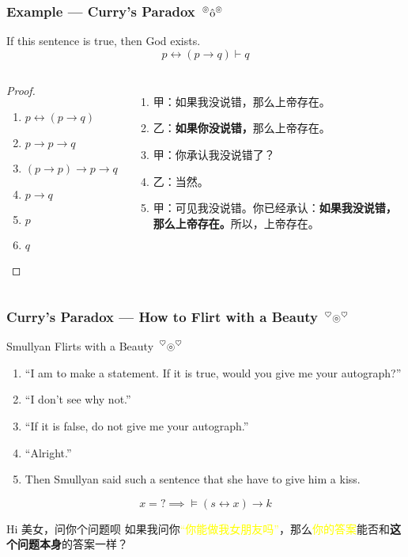 \documentclass[UTF8,aspectratio=43,11pt,colorlinks,compress,openany]{beamer}%
\begin{document}
\begin{frame}\frametitle{Example --- Curry's Paradox $\sideset{^\circledcirc}{^\circledcirc}{\operatorname{\hat{o}}}$}
	\begin{block}{If this sentence is true, then God exists.}
		\[p\leftrightarrow(p\to q)\vdash q\]
	\end{block}
\begin{columns}
	\begin{proof}
		\begin{enumerate}
			\item $p\leftrightarrow(p\to q)$
			\item $p\to p\to q$
			\item $(p\to p)\to p\to q$
			\item $p\to q$
			\item $p$
			\item $q$
		\end{enumerate}
	\end{proof}
\begin{enumerate}
	\item 甲：如果我没说错，那么上帝存在。
	\item 乙：\textbf{如果你没说错，}那么上帝存在。
	\item 甲：你承认我没说错了？
	\item 乙：当然。
	\item 甲：可见我没说错。你已经承认：\textbf{如果我没说错，那么上帝存在。}所以，上帝存在。
\end{enumerate}
\end{columns}\centering
\fbox{\textcolor{red}{This sentence is false, and God does not exist.}}
\end{frame}

\begin{frame}\frametitle{Curry's Paradox --- How to Flirt with a Beauty $\sideset{^\heartsuit}{^\heartsuit}{\operatorname{\circledcirc}}$}
	\begin{block}{Smullyan Flirts with a Beauty $\sideset{^\heartsuit}{^\heartsuit}{\operatorname{\circledcirc}}$}
	\begin{enumerate}\small
		\item ``I am to make a statement. If it is true, would you give me your autograph?''
		\item ``I don't see why not.''
		\item ``If it is false, do not give me your autograph.''
		\item ``Alright.''
		\item Then Smullyan said such a sentence that she have to give him a kiss.
	\end{enumerate}
	\end{block}
\[x=?\implies\vDash(s\leftrightarrow x)\to k\]
\begin{block}{Hi 美女，问你个问题呗}
如果我问你\textcolor{yellow}{“你能做我女朋友吗”}，那么\textcolor{yellow}{你的答案}能否和\textbf{这个问题本身}的答案一样？
\end{block}
\end{frame}
\end{document}
